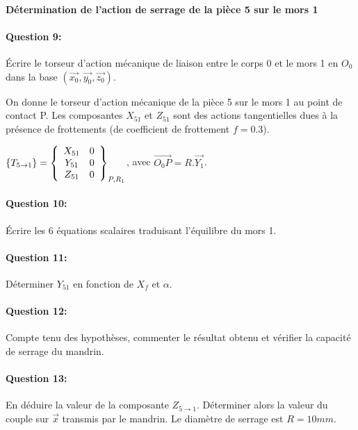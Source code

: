 ~\

\textbf{Détermination de l'action de serrage de la pièce 5 sur le mors 1}

\paragraph{Question 9:} Écrire le torseur d'action mécanique de liaison entre le corps 0 et le mors 1 en $O_0$ dans la base $(\overrightarrow{x_0},\overrightarrow{y_0},\overrightarrow{z_0})$. 

On donne le torseur d'action mécanique de la pièce 5 sur le mors 1 au point de contact P. Les composantes $X_{51}$ et  $Z_{51}$ sont des actions tangentielles dues à la présence de frottements (de coefficient de frottement $f=0.3$).

$\left\{T_{5 \rightarrow 1}\right\}=\left\{
  \begin{array}{c c}
  X_{51} & 0 \\
  Y_{51} & 0 \\
  Z_{51} & 0
  \end{array}\right\}_{P,R_1}$, avec $\overrightarrow{O_0P}=R.\overrightarrow{Y_1}$.

\paragraph{Question 10:} Écrire les 6 équations scalaires traduisant l'équilibre du mors 1. 

\paragraph{Question 11:} Déterminer $Y_{51}$ en fonction de $X_f$ et $\alpha$. 

\paragraph{Question 12:} Compte tenu des hypothèses, commenter le résultat obtenu et vérifier la capacité de serrage du mandrin.

\paragraph{Question 13:} En déduire la valeur de la composante $Z_{5 \rightarrow 1}$. Déterminer alors la valeur du couple sur $\overrightarrow{x}$ transmis par le mandrin. Le diamètre de serrage est $R=10mm$.

